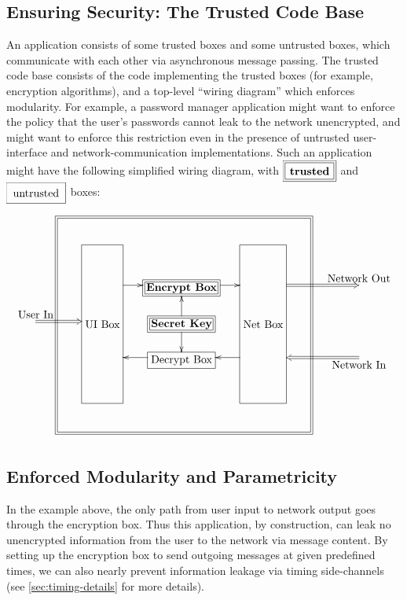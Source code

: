 \documentclass{article}
\newcommand{\trusted}[1]{*++[o][F=]{#1}}
\newcommand{\untrusted}[1]{*++[o][F-]{#1}}
\begin{document}
\subsection{Ensuring Security: The Trusted Code Base}
{%
\def\untrusted#1{\save[].[#1]*[F]\frm{}\restore}
\def\trusted#1{\save[].[#1]*[F=]\frm{}\restore}
An application consists of some trusted boxes and some untrusted boxes, which communicate with each other via asynchronous message passing.  The trusted code base consists of the code implementing the trusted boxes (for example, encryption algorithms), and a top-level ``wiring diagram'' which enforces modularity.  For example, a password manager application might want to enforce the policy that the user's passwords cannot leak to the network unencrypted, and might want to enforce this restriction even in the presence of untrusted user-interface and network-communication implementations.  Such an application might have the following simplified wiring diagram, with $\xymatrix{*++[F=]{\txt{\textbf{trusted}}}}$ and $\xymatrix{*++[F-]{\txt{untrusted}}}$ boxes:

\noindent
\[
\xymatrix@-0.5pc{
&\trusted{ddddddrrrr} \\
&&\untrusted{dddd}\txt{\phantom{UI Box}}& \txt{\phantom{Encrypt Box}} & \untrusted{dddd}\txt{\phantom{Net Box}}&& \\
&&\txt{\phantom{UI Box}}\ar[r]& \trusted{}\txt{\textbf{Encrypt Box}}\ar[r]     &                 \txt{\phantom{Net Box}}\ar@{=>}[rrr]^>{\txt{Network Out}}&&& \\
\ar@{=>}[rr]^<{\txt{User In}}&&\txt{UI Box}&  \ar[u]\ar[d]\trusted{}\txt{\textbf{Secret Key}}     &                 \txt{Net Box}& \\
&&\txt{\phantom{UI Box}}&  \ar[l]\untrusted{}\txt{Decrypt Box}     & \ar[l] \txt{\phantom{Net Box}}&&&\ar@{=>}[lll]^<{\txt{Network In}} \\
&&\txt{\phantom{UI Box}}& \txt{\phantom{Encrypt Box}} & \txt{\phantom{Net Box}}&& \\
&&\txt{\phantom{UI Box}}& \txt{\phantom{Encrypt Box}} & \txt{\phantom{Net Box}}&& \\
}
\]
}

\subsection{Enforced Modularity and Parametricity}
In the example above, the only path from user input to network output goes through the encryption box.  Thus this application, by construction, can leak no unencrypted information from the user to the network via message content.  By setting up the encryption box to send outgoing messages at given predefined times, we can also nearly prevent information leakage via timing side-channels (see \autoref{sec:timing-details} for more details).
\end{document}
